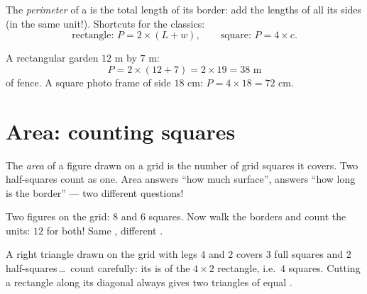 \begin{definition}[Perimeter]\label{def:g4:measure:perimeter}
The \emph{perimeter} of a  is the total
length of its border: add the lengths of all its sides (in the same
unit!). Shortcuts for the classics:
\[
\text{rectangle: } P = 2 \times (L + w),
\qquad
\text{square: } P = 4 \times c .
\]
\end{definition}

\begin{example}\label{ex:g4:measure:perimeter}
A rectangular garden $12$ m by $7$ m:
\[
P = 2 \times (12 + 7) = 2 \times 19 = 38 \text{ m}
\]
of fence. A square photo frame of side $18$ cm:
$P = 4 \times 18 = 72$ cm.
\end{example}

\section{Area: counting squares}

\begin{definition}\label{def:g4:measure:area}
The \emph{area} of a figure drawn on a grid is the number
of grid squares it covers. Two half-squares count as one. Area
answers ``how much surface'',  answers ``how long is the
border'' --- two different questions!
\end{definition}

\begin{omfigure}

{\small Two figures on the grid:  $8$ and $6$ squares. Now walk
the borders and count the units: $12$ for both! Same ,
different .}
\end{omfigure}

\begin{example}\label{ex:g4:measure:half}
A right triangle drawn on the grid with legs $4$ and $2$ covers $3$
full squares and $2$ half-squares\,\dots\ count carefully: its 
is  of the $4 \times 2$ rectangle, i.e.\ $4$ squares. Cutting a
rectangle along its diagonal always gives two triangles of equal
.
\end{example}

